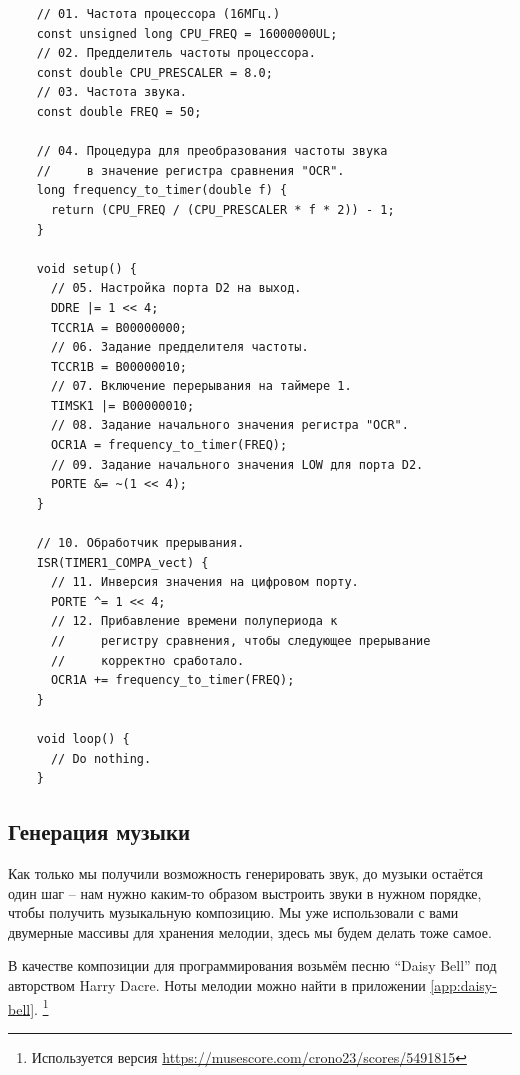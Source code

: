 \documentclass[../sparc.tex]{subfiles}
\begin{document}
\begin{listing}[H]
  \begin{verbatim}
    // 01. Частота процессора (16МГц.)
    const unsigned long CPU_FREQ = 16000000UL;
    // 02. Предделитель частоты процессора.
    const double CPU_PRESCALER = 8.0;
    // 03. Частота звука.
    const double FREQ = 50;

    // 04. Процедура для преобразования частоты звука
    //     в значение регистра сравнения "OCR".
    long frequency_to_timer(double f) {
      return (CPU_FREQ / (CPU_PRESCALER * f * 2)) - 1;
    }

    void setup() {
      // 05. Настройка порта D2 на выход.
      DDRE |= 1 << 4;
      TCCR1A = B00000000;
      // 06. Задание предделителя частоты.
      TCCR1B = B00000010;
      // 07. Включение перерывания на таймере 1.
      TIMSK1 |= B00000010;
      // 08. Задание начального значения регистра "OCR".
      OCR1A = frequency_to_timer(FREQ);
      // 09. Задание начального значения LOW для порта D2.
      PORTE &= ~(1 << 4);
    }

    // 10. Обработчик прерывания.
    ISR(TIMER1_COMPA_vect) {
      // 11. Инверсия значения на цифровом порту.
      PORTE ^= 1 << 4;
      // 12. Прибавление времени полупериода к
      //     регистру сравнения, чтобы следующее прерывание
      //     корректно сработало.
      OCR1A += frequency_to_timer(FREQ);
    }

    void loop() {
      // Do nothing.
    }
  \end{verbatim}
  \caption{Код генерации звука с частотой 50Гц с помощью прерывания по таймеру.}
  \label{listing:mcu-music-2}
\end{listing}

\subsection{Генерация музыки}
\label{subsection:mcu-music-1}

Как только мы получили возможность генерировать звук, до музыки остаётся один
шаг -- нам нужно каким-то образом выстроить звуки в нужном порядке, чтобы
получить музыкальную композицию.  Мы уже использовали с вами двумерные массивы
для хранения мелодии, здесь мы будем делать тоже самое.

В качестве композиции для программирования возьмём песню ``Daisy Bell'' под
авторством Harry Dacre.  Ноты мелодии можно найти в приложении
\ref{app:daisy-bell}.  \footnote{Используется версия
\url{https://musescore.com/crono23/scores/5491815}}
\end{document}
